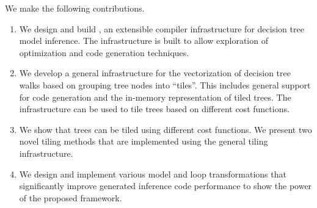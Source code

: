 We make the following contributions.
\begin{enumerate}
  \item We design and build \Treebeard{}, an extensible compiler infrastructure for decision tree model inference. The 
  infrastructure is built to allow exploration of optimization and code generation techniques. 
  \item We develop a general infrastructure for the vectorization of decision tree walks based on grouping tree nodes into ``tiles''.
   This includes general support for code generation and the in-memory representation of tiled trees. The infrastructure can be 
   used to tile trees based on different cost functions.
  \item We show that trees can be tiled using different cost functions. We present two novel tiling methods that are implemented
  using the general tiling infrastructure. 
  \item We design and implement various model and loop transformations that significantly improve generated inference code performance 
  to show the power of the proposed framework.
\end{enumerate}


